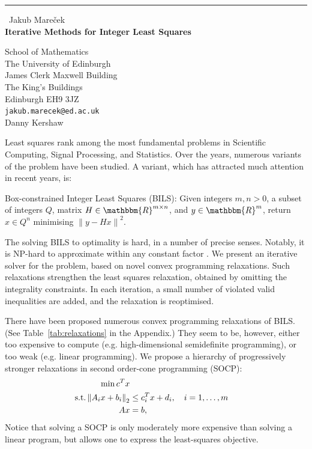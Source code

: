 \documentclass{report}
\begin{document}
\begin{center}
\rule{6in}{1pt} \
{\large Jakub Mare{\v c}ek \\
{\bf Iterative Methods for Integer Least Squares}}

School of Mathematics \\ The University of Edinburgh \\ James Clerk Maxwell Building \\ The King's Buildings \\ Edinburgh EH9 3JZ
\\
{\tt jakub.marecek@ed.ac.uk}\\
Danny Kershaw\end{center}

\newcommand{\R}{\ensuremath{\mathbbm{R}}}
\newcommand{\N}{\ensuremath{\mathbbm{N}}}
\newcommand{\prob}[2]{\underset{#1}{\rm Prob}\left[{#2}\right]}
\newcommand{\norm}[1]{\left\| {#1} \right\|}
\DeclareMathOperator{\st}{s. t.}
\DeclareMathOperator{\kron}{\,\otimes\,}
\DeclareMathOperator{\diag}{diag}

Least squares rank among the most fundamental problems in Scientific
Computing, Signal Processing, and Statistics.
Over the years, numerous variants of the problem have been studied. A
variant, which has attracted much attention in recent years, is:

{\sc Box-constrained Integer Least Squares (BILS)}: Given integers $m, n
> 0$, a subset of integers $Q$, matrix $H \in \R^{m \times n}$,
and $y \in \R^m$, return $x\in Q^n$ minimising $\norm{y - Hx}^2$.

The solving {\sc BILS} to optimality is hard, in a number of precise
senses. Notably, it is NP-hard to approximate within any constant factor
\cite{MR1462727}. We present an iterative solver for the problem, based
on novel convex programming relaxations.
Such relaxations strengthen the least squares relaxation, obtained by
omitting the integrality constraints. In each iteration, a small number
of violated valid inequalities are added, and the relaxation is
reoptimised.

There have been proposed numerous convex programming relaxations of {\sc
BILS}. (See Table~\ref{tab:relaxations} in the Appendix.)
They seem to be, however, either too expensive to compute (e.g.
high-dimensional semidefinite programming), or too weak (e.g. linear
programming). We propose a hierarchy of progressively stronger
relaxations in second order-cone programming (SOCP):
\begin{align}
\min c^T x \\
\st \left\| A_i x + b_i \right\|_2 & \leq c_i^T x + d_i, \quad i = 1,\dots,m \notag \\
Ax & = b, \notag
\end{align}
Notice that solving a SOCP is only moderately more expensive than solving
a linear program,
but allows one to express the least-squares objective.
\end{document}
